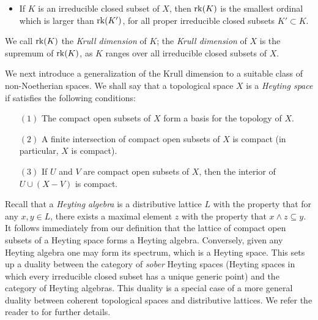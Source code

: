 \begin{itemize}
\item If $K$ is an irreducible closed subset of $X$, then $\operatorname{rk}(K)$ is the smallest ordinal which is larger than $\operatorname{rk}(K')$, for all proper irreducible closed subsets $K' \subset K$.
\end{itemize}

We call $\operatorname{rk}(K)$ the {\it Krull dimension} of $K$; the {\it Krull dimension} of $X$ is the supremum of $\operatorname{rk}(K)$, as $K$ ranges over all irreducible closed subsets of $X$.

We next introduce a generalization of the Krull dimension to a suitable class of non-Noetherian spaces. We shall say that a topological space $X$ is a {\it
Heyting space} if satisfies the following conditions:

\begin{itemize}
\item[$(1)$] The compact open subsets of $X$ form a basis for the topology of $X$.

\item[$(2)$] A finite intersection of compact open subsets of $X$ is compact (in particular, $X$ is compact).

\item[$(3)$] If $U$ and $V$ are compact open subsets of
$X$, then the interior of $U \cup (X-V)$ is compact. 

\end{itemize}

\begin{remark}
Recall that a {\it Heyting algebra} is a distributive lattice $L$
with the property that for any $x,y \in L$, there exists a maximal
element $z$ with the property that $x \wedge z \subseteq y$. It
follows immediately from our definition that the lattice of
compact open subsets of a Heyting space forms a Heyting algebra.
Conversely, given any Heyting algebra one may form its spectrum,
which is a Heyting space. This sets up a duality between the
category of {\em sober} Heyting spaces (Heyting spaces in which every irreducible
closed subset has a unique generic point) and the category of Heyting algebras. This
duality is a special case of a more general duality between coherent
topological spaces and distributive lattices. We refer the reader
to \cite{johnstone} for further details.
\end{remark}

